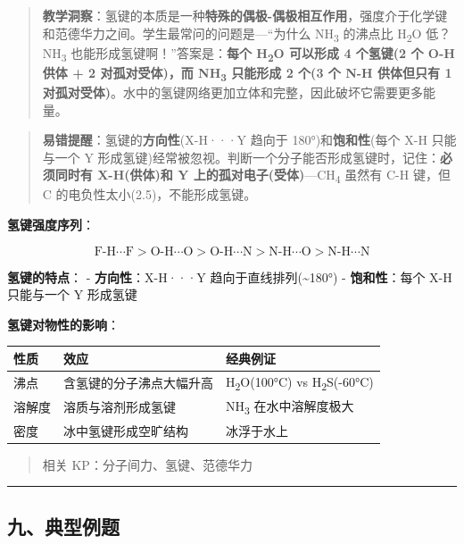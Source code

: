 \begin{quote}
\textbf{教学洞察}：氢键的本质是一种\textbf{特殊的偶极-偶极相互作用}，强度介于化学键和范德华力之间。学生最常问的问题是---``为什么 NH\textsubscript{3} 的沸点比 H\textsubscript{2}O 低？NH\textsubscript{3} 也能形成氢键啊！''答案是：\textbf{每个 H\textsubscript{2}O 可以形成 4 个氢键(2 个 O-H 供体 + 2 对孤对受体)，而 NH\textsubscript{3} 只能形成 2 个(3 个 N-H 供体但只有 1 对孤对受体)}。水中的氢键网络更加立体和完整，因此破坏它需要更多能量。
\end{quote}

\begin{quote}
\textbf{易错提醒}：氢键的\textbf{方向性}(X-H···Y 趋向于 180°)和\textbf{饱和性}(每个 X-H 只能与一个 Y 形成氢键)经常被忽视。判断一个分子能否形成氢键时，记住：\textbf{必须同时有 X-H(供体)和 Y 上的孤对电子(受体)}---CH\textsubscript{4} 虽然有 C-H 键，但 C 的电负性太小(2.5)，不能形成氢键。
\end{quote}

\textbf{氢键强度序列}：

\[
\text{F-H} \cdots \text{F} > \text{O-H} \cdots \text{O} > \text{O-H} \cdots \text{N} > \text{N-H} \cdots \text{O} > \text{N-H} \cdots \text{N}
\]

\textbf{氢键的特点}：
- \textbf{方向性}：X-H···Y 趋向于直线排列(\textasciitilde180°)
- \textbf{饱和性}：每个 X-H 只能与一个 Y 形成氢键

\textbf{氢键对物性的影响}：

{\def\LTcaptype{none} %
\begin{longtable}[]{@{}lll@{}}
\toprule\noalign{}
性质 & 效应 & 经典例证 \\
\midrule\noalign{}
\endhead
\bottomrule\noalign{}
\endlastfoot
沸点 & 含氢键的分子沸点大幅升高 & H\textsubscript{2}O(100°C) vs H\textsubscript{2}S(-60°C) \\
溶解度 & 溶质与溶剂形成氢键 & NH\textsubscript{3} 在水中溶解度极大 \\
密度 & 冰中氢键形成空旷结构 & 冰浮于水上 \\
\end{longtable}
}

\begin{quote}
相关 KP：分子间力、氢键、范德华力
\end{quote}

\begin{center}\rule{0.5\linewidth}{0.5pt}\end{center}

\subsection{九、典型例题}\label{ux4e5dux5178ux578bux4f8bux9898}

